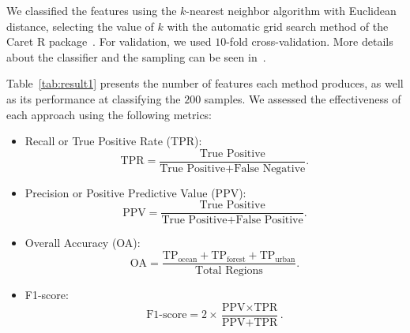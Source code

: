 \documentclass[journal]{IEEEtran}
\begin{document}
We classified the features using the $k$-nearest neighbor algorithm with Euclidean distance, selecting the value of $k$ with the automatic grid search method of the Caret R package~\cite{kuhn2008building}.
For validation, we used $10$-fold cross-validation.
More details about the classifier and the sampling can be seen in~\cite{mitchell1997machine}.

Table~\ref{tab:result1} presents the number of features each method produces, as well as its performance at classifying the $200$ samples.
We assessed the effectiveness of each approach using the following metrics: 
\begin{itemize}
	\item Recall or True Positive Rate (TPR): 
	\begin{equation*}
	\text{TPR} = \frac{\text{True Positive}}{\text{True Positive} + \text{False Negative}}.
	\end{equation*}
	\item Precision or Positive Predictive Value (PPV): \begin{equation*}
	\text{PPV} = \frac{\text{True Positive}}{\text{True Positive} + \text{False Positive}}.
	\end{equation*}
	\item Overall Accuracy (OA): 
	\begin{equation*}
	\text{OA} = \frac{\text{TP}_{\text{ocean}} + \text{TP}_{\text{forest}} + \text{TP}_{\text{urban}}}{\text{Total Regions}}.
	\end{equation*}
	\item F1-score: 
	\begin{equation*}
	\text{F1-score} = 2 \times \frac{\text{PPV} \times \text{TPR}}{\text{PPV} + \text{TPR}}.
	\end{equation*}
\end{itemize}
\end{document}
